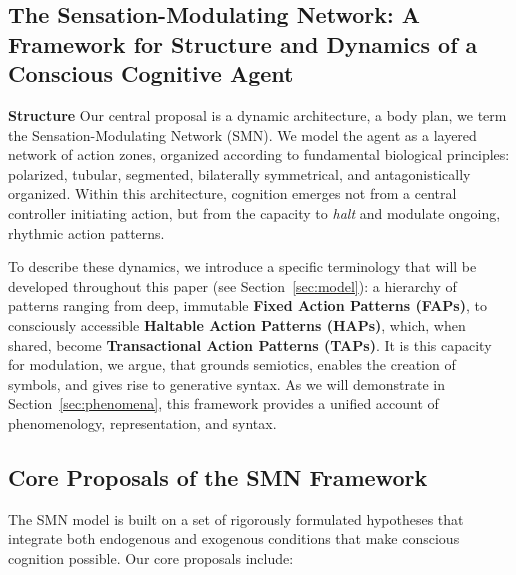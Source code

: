 \subsection{The Sensation-Modulating Network: A Framework for Structure and Dynamics of a Conscious Cognitive Agent}

\textbf{Structure} Our central proposal is a dynamic architecture, a body plan, we term the Sensation-Modulating Network (SMN). We model the agent as a layered network of action zones, organized according to fundamental biological principles: polarized, tubular, segmented, bilaterally symmetrical, and antagonistically organized. Within this architecture, cognition emerges not from a central controller initiating action, but from the capacity to \textit{halt} and modulate ongoing, rhythmic action patterns. 

To describe these dynamics, we introduce a specific terminology that will be developed throughout this paper (see Section~\ref{sec:model}): a hierarchy of patterns ranging from deep, immutable \textbf{Fixed Action Patterns (FAPs)}, to consciously accessible \textbf{Haltable Action Patterns (HAPs)}, which, when shared, become \textbf{Transactional Action Patterns (TAPs)}. It is this capacity for modulation, we argue, that grounds semiotics\cite{peirce1992essential}, enables the creation of symbols, and gives rise to generative syntax\cite{chomsky1965aspects}. As we will demonstrate in Section~\ref{sec:phenomena}, this framework provides a unified account of phenomenology, representation, and syntax.

\subsection{Core Proposals of the SMN Framework}
The SMN model is built on a set of rigorously formulated hypotheses that integrate both endogenous and exogenous conditions that make conscious cognition possible. Our core proposals include:

